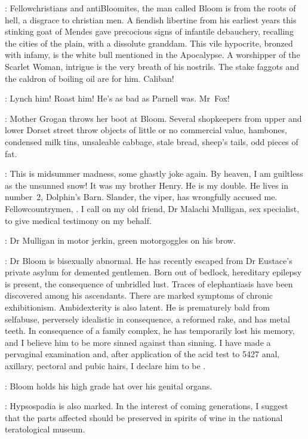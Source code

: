 \Dowie[1]:
Fellowchristians and antiBloomites,
the man called Bloom is from the roots of hell,
a disgrace to christian men.
A fiendish libertine from his earliest years
this stinking goat of Mendes
gave precocious signs of infantile debauchery,
recalling the cities of the plain,
with a dissolute granddam.
This vile hypocrite,
bronzed with infamy,
is the white bull mentioned in the Apocalypse.
A worshipper of the Scarlet Woman,
intrigue is the very breath of his nostrils.
The stake faggots and the caldron of boiling oil are for him.
Caliban!

\Mob[2]:
Lynch him!
Roast him!
He's as bad as Parnell was.
Mr~Fox!

:
Mother Grogan throws her boot at Bloom.
Several shopkeepers from upper and lower Dorset street
throw objects of little or no commercial value,
hambones,
condensed milk tins,
unsaleable cabbage,
stale bread,
sheep's tails,
odd pieces of fat.

\Bloom:
This is midsummer madness,
some ghastly joke again.
By heaven,
I am guiltless as the unsunned snow!
It was my brother Henry.
He is my double.
He lives in number~2,
Dolphin's Barn.
Slander,
the viper,
has wrongfully accused me.
Fellowcountrymen,
.
I call on my old friend,
Dr Malachi Mulligan,
sex specialist,
to give medical testimony on my behalf.

:
Dr Mulligan in motor jerkin,
green motorgoggles on his brow.

\DrMulligan:
Dr Bloom is bisexually abnormal.
He has recently escaped from Dr Eustace's
private asylum for demented gentlemen.
Born out of bedlock,
hereditary epilepsy is present,
the consequence of unbridled lust.
Traces of elephantiasis have been discovered among his ascendants.
There are marked symptoms of chronic exhibitionism.
Ambidexterity is also latent.
He is prematurely bald from selfabuse,
perversely idealistic in consequence,
a reformed rake,
and has metal teeth.
In consequence of a family complex,
he has temporarily lost his memory,
and I believe him to be more sinned against than sinning.
I have made a pervaginal examination
and,
after application of the acid test to
5427 anal,
axillary,
pectoral and pubic hairs,
I declare him to be .

:
Bloom holds his high grade hat over his genital organs.

\DrMadden[2]:
Hypsospadia is also marked.
In the interest of coming generations,
I suggest that the parts affected should be preserved
in spirits of wine in the national teratological museum.

